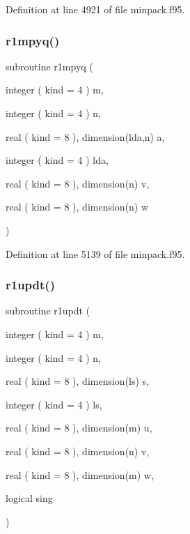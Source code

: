 Definition at line 4921 of file minpack.\+f95.

\mbox{\label{minpack_8f95_ab7f6e61d92cfd9ea516435ad523b989b}} 
\subsubsection{\texorpdfstring{r1mpyq()}{r1mpyq()}}
{\footnotesize\ttfamily subroutine r1mpyq (\begin{DoxyParamCaption}\item[{integer ( kind = 4 )}]{m,  }\item[{integer ( kind = 4 )}]{n,  }\item[{real ( kind = 8 ), dimension(lda,n)}]{a,  }\item[{integer ( kind = 4 )}]{lda,  }\item[{real ( kind = 8 ), dimension(n)}]{v,  }\item[{real ( kind = 8 ), dimension(n)}]{w }\end{DoxyParamCaption})}



Definition at line 5139 of file minpack.\+f95.

\mbox{\label{minpack_8f95_a8ff726029b3ff9037b390910744ee58b}} 
\subsubsection{\texorpdfstring{r1updt()}{r1updt()}}
{\footnotesize\ttfamily subroutine r1updt (\begin{DoxyParamCaption}\item[{integer ( kind = 4 )}]{m,  }\item[{integer ( kind = 4 )}]{n,  }\item[{real ( kind = 8 ), dimension(ls)}]{s,  }\item[{integer ( kind = 4 )}]{ls,  }\item[{real ( kind = 8 ), dimension(m)}]{u,  }\item[{real ( kind = 8 ), dimension(n)}]{v,  }\item[{real ( kind = 8 ), dimension(m)}]{w,  }\item[{logical}]{sing }\end{DoxyParamCaption})}



